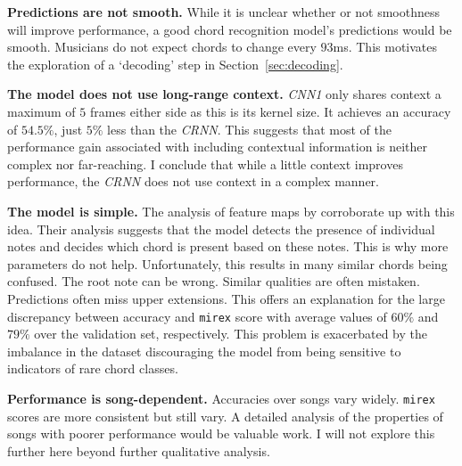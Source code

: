 \textbf{Predictions are not smooth.} While it is unclear whether or not smoothness will improve performance, a good chord recognition model's predictions would be smooth. Musicians do not expect chords to change every $93$ms. This motivates the exploration of a `decoding' step in Section~\ref{sec:decoding}.

\textbf{The model does not use long-range context.} \emph{CNN1} only shares context a maximum of $5$ frames either side as this is its kernel size. It achieves an accuracy of $54.5\%$, just $5\%$ less than the \emph{CRNN}. This suggests that most of the performance gain associated with including contextual information is neither complex nor far-reaching. I conclude that while a little context improves performance, the \emph{CRNN} does not use context in a complex manner. 



\textbf{The model is simple.} The analysis of feature maps by \citet{FeatureMaps} corroborate up with this idea. Their analysis suggests that the model detects the presence of individual notes and decides which chord is present based on these notes. This is why more parameters do not help. Unfortunately, this results in many similar chords being confused. The root note can be wrong. Similar qualities are often mistaken. Predictions often miss upper extensions. This offers an explanation for the large discrepancy between accuracy and \texttt{mirex} score with average values of $60\%$ and $79\%$ over the validation set, respectively. This problem is exacerbated by the imbalance in the dataset discouraging the model from being sensitive to indicators of rare chord classes.

\textbf{Performance is song-dependent.} Accuracies over songs vary widely. \texttt{mirex} scores are more consistent but still vary. A detailed analysis of the properties of songs with poorer performance would be valuable work. I will not explore this further here beyond further qualitative analysis.

